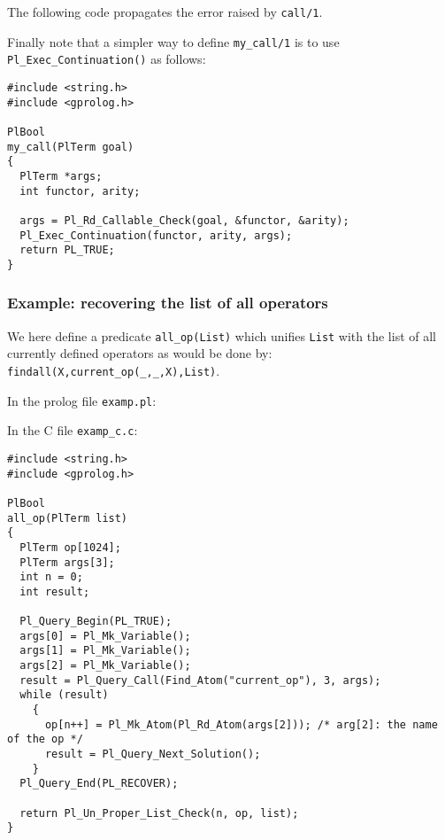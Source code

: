 The following code propagates the error raised by \texttt{call/1}.

\begin{CodeTwoCols}
\end{CodeTwoCols}

Finally note that a simpler way to define \texttt{my\_call/1} is to use
\texttt{Pl\_Exec\_Continuation()} as follows:

\begin{Indentation}
\begin{verbatim}
#include <string.h>
#include <gprolog.h>

PlBool
my_call(PlTerm goal)
{
  PlTerm *args;
  int functor, arity;

  args = Pl_Rd_Callable_Check(goal, &functor, &arity);
  Pl_Exec_Continuation(functor, arity, args);
  return PL_TRUE;
}
\end{verbatim}
\end{Indentation}

\subsubsection{Example: recovering the list of all operators}

We here define a predicate \texttt{all\_op(List)} which unifies
\texttt{List} with the list of all currently defined operators as would be done by: \texttt{findall(X,current\_op(\_,\_,X),List)}.

In the prolog file \texttt{examp.pl}:


In the C file \texttt{examp\_c.c}:

\begin{Indentation}
\begin{verbatim}
#include <string.h>
#include <gprolog.h>

PlBool
all_op(PlTerm list)
{
  PlTerm op[1024];
  PlTerm args[3];
  int n = 0;
  int result;

  Pl_Query_Begin(PL_TRUE);
  args[0] = Pl_Mk_Variable();
  args[1] = Pl_Mk_Variable();
  args[2] = Pl_Mk_Variable();
  result = Pl_Query_Call(Find_Atom("current_op"), 3, args);
  while (result)
    {
      op[n++] = Pl_Mk_Atom(Pl_Rd_Atom(args[2])); /* arg[2]: the name of the op */
      result = Pl_Query_Next_Solution();
    }
  Pl_Query_End(PL_RECOVER);

  return Pl_Un_Proper_List_Check(n, op, list);
}
\end{verbatim}
\end{Indentation}

